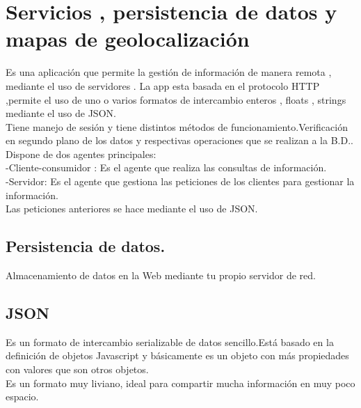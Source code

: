 \chapter{Servicios , persistencia de datos y mapas de geolocalizaci\'on}
Es una aplicaci\'on  que permite la gesti\'on de informaci\'on de manera remota , mediante el uso de servidores .
La app esta basada en el protocolo HTTP ,permite  el uso de uno o varios formatos de intercambio enteros , floats , strings mediante el uso de JSON.\\
Tiene manejo de sesi\'on y tiene distintos m\'etodos de funcionamiento.Verificaci\'on en segundo plano de los datos y respectivas operaciones que se realizan a la B.D..\\
Dispone de dos agentes principales:\\
-Cliente-consumidor : Es el agente que realiza las consultas de informaci\'on.\\
-Servidor: Es el agente que gestiona las peticiones de los
clientes para gestionar la informaci\'on.\\
Las peticiones anteriores se hace mediante el uso de JSON.\\
\section{Persistencia de datos.}
Almacenamiento de datos en la Web mediante tu propio servidor de red.

\section{JSON} 
Es un formato de intercambio serializable de datos
sencillo.Est\'a basado en la definici\'on de objetos Javascript y b\'asicamente es un objeto con m\'as propiedades con valores que son otros objetos.\\
Es un formato muy liviano, ideal para compartir mucha informaci\'on en muy poco espacio.\\
